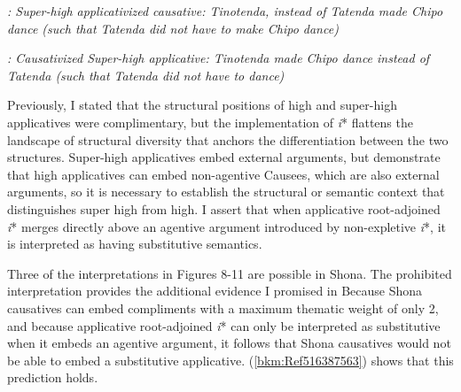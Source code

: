 \documentclass[output=paper,modfonts,nonflat]{langsci/langscibook}
\begin{document}
\begin{styleDefault}
\textit{: Super-high applicativized causative: Tinotenda, instead of Tatenda made Chipo dance (such that Tatenda did not have to make Chipo dance)}
\end{styleDefault}

\begin{styleDefault}
  
 
\end{styleDefault}

\begin{styleDefault}
\textit{: Causativized Super-high applicative: Tinotenda made Chipo dance instead of Tatenda (such that Tatenda did not have to dance)}
\end{styleDefault}

\begin{styleDefault}
Previously, I stated that the structural positions of high and super-high applicatives were complimentary, but the implementation of \textit{i}* flattens the landscape of structural diversity that anchors the differentiation between the two structures. Super-high applicatives embed external arguments, but  demonstrate that high applicatives can embed non-agentive Causees, which are also external arguments, so it is necessary to establish the structural or semantic context that distinguishes super high from high. I assert that when applicative root-adjoined \textit{i}* merges directly above an agentive argument introduced by non-expletive \textit{i}*, it is interpreted as having substitutive semantics. 
\end{styleDefault}

\begin{styleDefault}
Three of the interpretations in Figures 8-11 are possible in Shona. The prohibited interpretation provides the additional evidence I promised in  Because Shona causatives can embed compliments with a maximum thematic weight of only 2, and because applicative root-adjoined \textit{i}* can only be interpreted as substitutive when it embeds an agentive argument, it follows that Shona causatives would not be able to embed a substitutive applicative. (\ref{bkm:Ref516387563}) shows that this prediction holds. 
\end{styleDefault}
\end{document}

